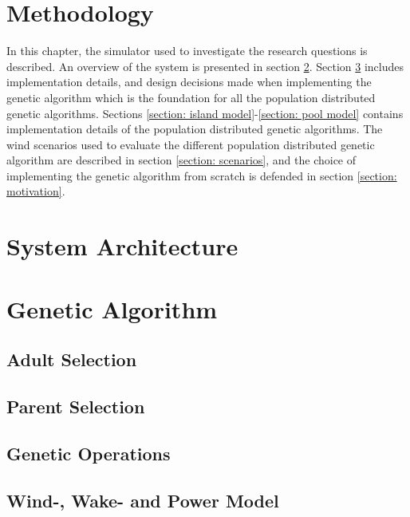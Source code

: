 \documentclass{article}
\begin{document}
\section{Methodology}\label{chapter:methodology}%


In this chapter, the simulator used to investigate the research questions is described. An overview of the system is presented in section \ref{section:systemt architecture}. Section \ref{section: genetic algorithm} includes implementation details, and design decisions made when implementing the genetic algorithm which is the foundation for all the population distributed genetic algorithms. Sections \ref{section: island model}-\ref{section: pool model} contains implementation details of the population distributed genetic algorithms. The wind scenarios used to evaluate the different population distributed genetic algorithm are described in section \ref{section: scenarios}, and the choice of implementing the genetic algorithm from scratch is defended in section \ref{section: motivation}.


\section{System Architecture}\label{section:systemt architecture}


\section{Genetic Algorithm}\label{section: genetic algorithm}


\subsection{Adult Selection}\label{subsection: adult selection}


\subsection{Parent Selection}\label{subsection: parent selection}


\subsection{Genetic Operations}\label{subsection: genetic operations}


\subsection{Wind-, Wake- and Power Model}\label{subsection: wind-, wake- and power model}
\end{document}
